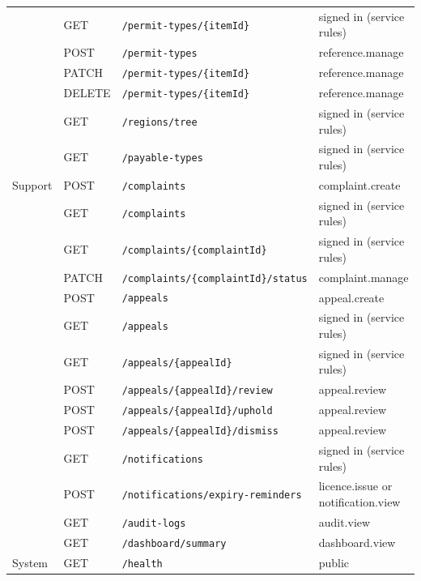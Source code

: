 \begin{longtable}{@{}p{2.1cm}l p{6.6cm} p{3.2cm}@{}}
 & GET & \texttt{/\allowbreak{}permit-types/\allowbreak{}\{itemId\}} & signed in (service rules) \\
 & POST & \texttt{/\allowbreak{}permit-types} & reference.manage \\
 & PATCH & \texttt{/\allowbreak{}permit-types/\allowbreak{}\{itemId\}} & reference.manage \\
 & DELETE & \texttt{/\allowbreak{}permit-types/\allowbreak{}\{itemId\}} & reference.manage \\
 & GET & \texttt{/\allowbreak{}regions/\allowbreak{}tree} & signed in (service rules) \\
 & GET & \texttt{/\allowbreak{}payable-types} & signed in (service rules) \\
Support & POST & \texttt{/\allowbreak{}complaints} & complaint.create \\
 & GET & \texttt{/\allowbreak{}complaints} & signed in (service rules) \\
 & GET & \texttt{/\allowbreak{}complaints/\allowbreak{}\{complaintId\}} & signed in (service rules) \\
 & PATCH & \texttt{/\allowbreak{}complaints/\allowbreak{}\{complaintId\}/\allowbreak{}status} & complaint.manage \\
 & POST & \texttt{/\allowbreak{}appeals} & appeal.create \\
 & GET & \texttt{/\allowbreak{}appeals} & signed in (service rules) \\
 & GET & \texttt{/\allowbreak{}appeals/\allowbreak{}\{appealId\}} & signed in (service rules) \\
 & POST & \texttt{/\allowbreak{}appeals/\allowbreak{}\{appealId\}/\allowbreak{}review} & appeal.review \\
 & POST & \texttt{/\allowbreak{}appeals/\allowbreak{}\{appealId\}/\allowbreak{}uphold} & appeal.review \\
 & POST & \texttt{/\allowbreak{}appeals/\allowbreak{}\{appealId\}/\allowbreak{}dismiss} & appeal.review \\
 & GET & \texttt{/\allowbreak{}notifications} & signed in (service rules) \\
 & POST & \texttt{/\allowbreak{}notifications/\allowbreak{}expiry-reminders} & licence.issue or notification.view \\
 & GET & \texttt{/\allowbreak{}audit-logs} & audit.view \\
 & GET & \texttt{/\allowbreak{}dashboard/\allowbreak{}summary} & dashboard.view \\
System & GET & \texttt{/\allowbreak{}health} & public \\

\end{longtable}
